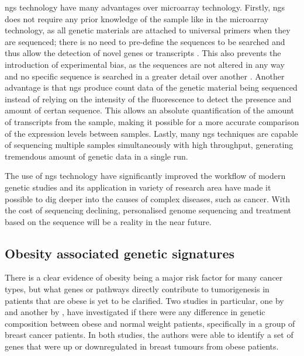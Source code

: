 \gls{ngs} technology have many advantages over microarray technology.
Firstly, \gls{ngs} does not require any prior knowledge of the sample like in the microarray technology, as all genetic materials are attached to universal primers when they are sequenced; there is no need to pre-define the sequences to be searched and thus allow the detection of novel genes or transcripts \citep{Hurd2009}.
This also prevents the introduction of experimental bias, as the sequences are not altered in any way and no specific sequence is searched in a greater detail over another \citep{Hurd2009}.
Another advantage is that \gls{ngs} produce count data of the genetic material being sequenced instead of relying on the intensity of the fluorescence to detect the presence and amount of certan sequence.
This allows an absolute quantification of the amount of transcripts from the sample, making it possible for a more accurate comparison of the expression levels between samples.
Lastly, many \gls{ngs} techniques are capable of sequencing multiple samples simultaneously with high throughput, generating tremendous amount of genetic data in a single run.

The use of \gls{ngs} technology have significantly improved the workflow of modern genetic studies and its application in variety of research area have made it possible to dig deeper into the causes of complex diseases, such as cancer.
With the cost of sequencing declining, personalised genome sequencing and treatment based on the sequence will be a reality in the near future.

\subsection{Obesity associated genetic signatures}
\label{sub:obesity_associated_genetic_signatures}

There is a clear evidence of obesity being a major risk factor for many cancer types, but what genes or pathways directly contribute to tumorigenesis in patients that are obese is yet to be clarified.
Two studies in particular, one by \citet{Creighton2012} and another by \citet{Fuentes-Mattei2014}, have investigated if there were any difference in genetic composition between obese and normal weight patients, specifically in a group of breast cancer patients.
In both studies, the authors were able to identify a set of genes that were up or downregulated in breast tumours from obese patients.

